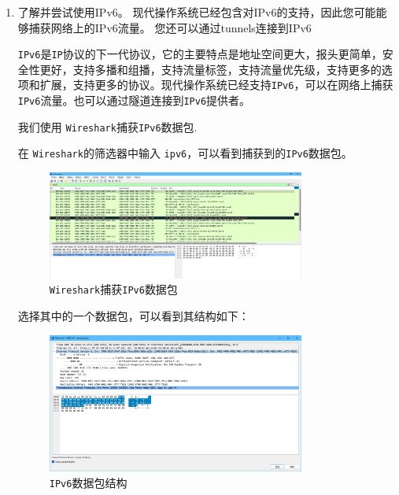\documentclass{article}
\begin{document}
\begin{enumerate}[noitemsep]
  \item 了解并尝试使用IPv6。 现代操作系统已经包含对IPv6的支持，因此您可能能够捕获网络上的IPv6流量。 您还可以通过tunnels连接到IPv6

        \texttt{IPv6}是\texttt{IP}协议的下一代协议，它的主要特点是地址空间更大，报头更简单，安全性更好，支持多播和组播，支持流量标签，支持流量优先级，支持更多的选项和扩展，支持更多的协议。现代操作系统已经支持\texttt{IPv6}，可以在网络上捕获\texttt{IPv6}流量。也可以通过隧道连接到\texttt{IPv6}提供者。

        我们使用 \texttt{Wireshark}捕获\texttt{IPv6}数据包.

        在 \texttt{Wireshark}的筛选器中输入 \texttt{ipv6}，可以看到捕获到的\texttt{IPv6}数据包。

        \begin{figure}[H]
          \centering
          \includegraphics[width=0.8\textwidth]{img/23.png}
          \caption{\texttt{Wireshark}捕获\texttt{IPv6}数据包}
          \label{fig:23}
        \end{figure}

        选择其中的一个数据包，可以看到其结构如下：

        \begin{figure}[H]
          \centering
          \includegraphics[width=0.8\textwidth]{img/24.png}
          \caption{\texttt{IPv6}数据包结构}
          \label{fig:24}
        \end{figure}


\end{enumerate}
\end{document}
